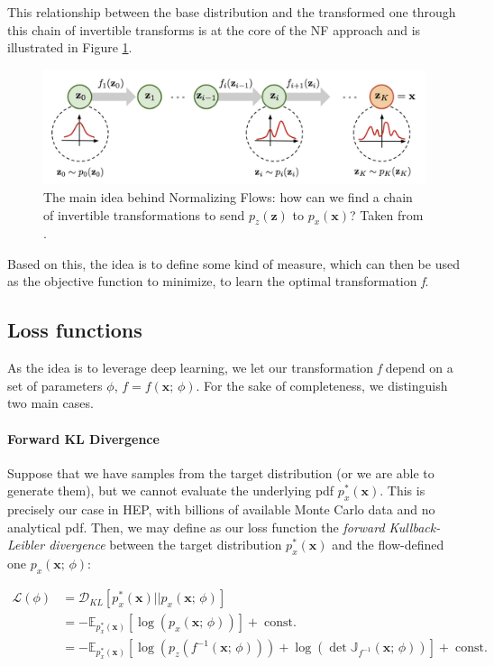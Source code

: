 This relationship between the base distribution and the transformed one through this chain of invertible transforms is at the core of the NF approach and is illustrated in Figure \ref{fig:nf}.

\begin{figure}
    \centering
    \includegraphics[width=\columnwidth]{gfx/ch4/normalizing-flow.png}
    \caption[Normalizing Flows]{The main idea behind Normalizing Flows: how can we find a chain of invertible transformations to send $p_z(\mathbf{z})$ to $p_x(\mathbf{x})$? Taken from \cite{nffig}.}
    \label{fig:nf}
\end{figure}
	
Based on this, the idea is to define some kind of measure, which can then be used as the objective function to minimize, to learn the optimal transformation \emph{f}.

\subsection{Loss functions}

As the idea is to leverage deep learning, we let our transformation \emph{f} depend on a set of parameters $\phi$, $f = f(\mathbf{x};\, \phi)$.
For the sake of completeness, we distinguish two main cases.

\paragraph{Forward KL Divergence}
Suppose that we have samples from the target distribution (or we are able to generate them), but we cannot evaluate the underlying pdf $p_x^*(\mathbf{x})$. This is precisely our case in HEP, with billions of available Monte Carlo data and no analytical pdf. Then, we may define as our loss function the \emph{forward Kullback-Leibler divergence} between the target distribution $p_x^*(\mathbf{x})$ and the flow-defined one $p_x(\mathbf{x}; \, \phi)$:

\begin{equation}\label{eqn:kldiv}
    \begin{aligned}
    \mathcal{L}(\phi) &= \mathcal{D}_{KL}[p_x^*(\mathbf{x})||p_x(\mathbf{x}; \, \phi)]\\
    &= -\mathbb{E}_{p_x^*(\mathbf{x})}[\log(p_x(\mathbf{x}; \, \phi))] +\; \text{const.}\\
    &= -\mathbb{E}_{p_x^*(\mathbf{x})}[\log(p_z(f^{-1}(\mathbf{x}; \, \phi)))+\log\left(\det\mathbb{J}_{f^{-1}}(\mathbf{x}; \, \phi)\right)] +\; \text{const.}
    \end{aligned}
\end{equation}

